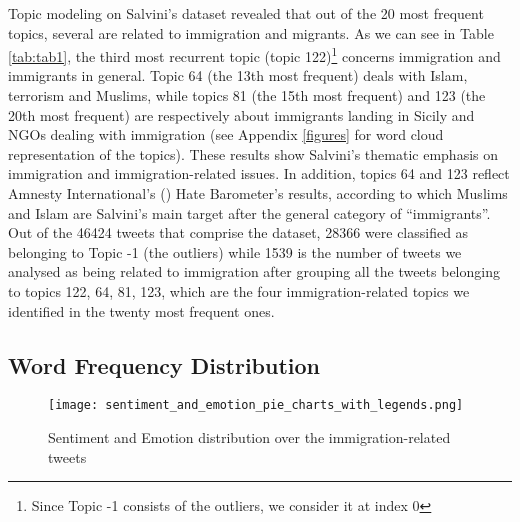 \documentclass[11pt]{article}
\begin{document}
Topic modeling on Salvini’s dataset revealed that out of the 20 most frequent topics, several are related to immigration and migrants. As we can see in Table \ref{tab:tab1}, the third most recurrent topic (topic 122)\footnote{Since Topic -1 consists of the outliers, we consider it at index 0} concerns immigration and immigrants in general. Topic 64 (the 13th most frequent) deals with Islam, terrorism and Muslims, while topics 81 (the 15th most frequent) and 123 (the 20th most frequent) are respectively about immigrants landing in Sicily and NGOs dealing with immigration (see Appendix \ref{figures} for word cloud representation of the topics). 
These results show Salvini's thematic emphasis on immigration and immigration-related issues. In addition, topics 64 and 123 reflect Amnesty International's (\citeyear{amnesty2018}) Hate Barometer’s results, according to which Muslims and Islam are Salvini’s main target after the general category of “immigrants”.
Out of the 46424 tweets that comprise the dataset, 28366 were classified as belonging to  Topic -1 (the outliers) while 1539 is the number of tweets we analysed as being related to immigration after grouping all the tweets belonging to topics 122, 64, 81, 123, which are the four immigration-related topics we identified in the twenty most frequent ones.

\subsection{Word Frequency Distribution}

\begin{figure*}[t]
  \texttt{[image: sentiment\_and\_emotion\_pie\_charts\_with\_legends.png]}
  \caption{Sentiment and Emotion distribution over the immigration-related tweets}
  \label{sentiment-emotion}
\end{figure*}
\end{document}
